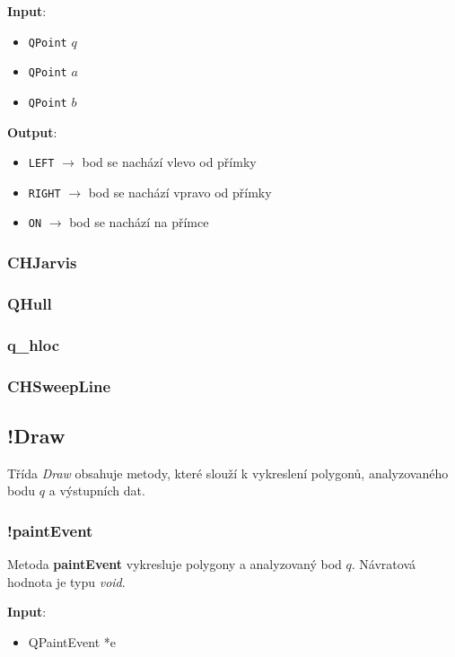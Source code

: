 \documentclass[a4paper, 12pt]{article}
\begin{document}
\textbf{Input}:
\begin{itemize}
\item \texttt{QPoint} $q$
\item \texttt{QPoint} $a$
\item \texttt{QPoint} $b$
\end{itemize}

\textbf{Output}:
\begin{itemize}
\item \texttt{LEFT} $\rightarrow$ bod se nachází vlevo od přímky
\item \texttt{RIGHT} $\rightarrow$ bod se nachází vpravo od přímky
\item \texttt{ON} $\rightarrow$ bod se nachází na přímce
\end{itemize}


\subsubsection{CHJarvis}



\subsubsection{QHull}




\subsubsection{q\_hloc}



\subsubsection{CHSweepLine}


\subsection{!Draw}
Třída \textsl{Draw} obsahuje metody, které slouží k vykreslení polygonů, analyzovaného bodu $q$ a výstupních dat.

\subsubsection{!paintEvent}
Metoda \textbf{paintEvent} vykresluje polygony a analyzovaný bod $q$. Návratová hodnota je typu \textsl{void}.

\textbf{Input}:
\begin{itemize}
\item QPaintEvent *e
\end{itemize}
\end{document}
